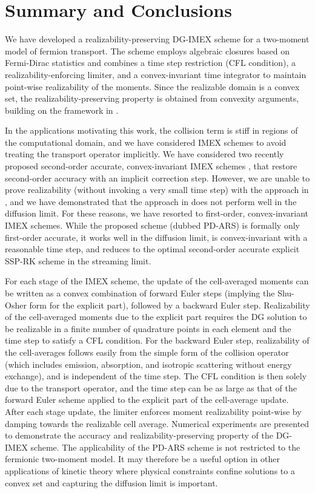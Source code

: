 \section{Summary and Conclusions}
\label{sec:conclusions}

We have developed a realizability-preserving DG-IMEX scheme for a two-moment model of fermion transport.  
The scheme employs algebraic closures based on Fermi-Dirac statistics and combines a time step restriction (CFL condition), a realizability-enforcing limiter, and a convex-invariant time integrator to maintain point-wise realizability of the moments.  
Since the realizable domain is a convex set, the realizability-preserving property is obtained from convexity arguments, building on the framework in \cite{zhangShu_2010a}.  

In the applications motivating this work, the collision term is stiff in regions of the computational domain, and we have considered IMEX schemes to avoid treating the transport operator implicitly.  
We have considered two recently proposed second-order accurate, convex-invariant IMEX schemes \cite{chertock_etal_2015,hu_etal_2018}, that restore second-order accuracy with an implicit correction step.  
However, we are unable to prove realizability (without invoking a very small time step) with the approach in \cite{chertock_etal_2015}, and we have demonstrated that the approach in \cite{hu_etal_2018} does not perform well in the diffusion limit.  
For these reasons, we have resorted to first-order, convex-invariant IMEX schemes.  
While the proposed scheme (dubbed PD-ARS) is formally only first-order accurate, it works well in the diffusion limit, is convex-invariant with a reasonable time step, and reduces to the optimal second-order accurate explicit SSP-RK scheme in the streaming limit.  

For each stage of the IMEX scheme, the update of the cell-averaged moments can be written as a convex combination of forward Euler steps (implying the Shu-Osher form for the explicit part), followed by a backward Euler step.  
Realizability of the cell-averaged moments due to the explicit part requires the DG solution to be realizable in a finite number of quadrature points in each element and the time step to satisfy a CFL condition.  
For the backward Euler step, realizability of the cell-averages follows easily from the simple form of the collision operator (which includes emission, absorption, and isotropic scattering without energy exchange), and is independent of the time step.  
The CFL condition is then solely due to the transport operator, and the time step can be as large as that of the forward Euler scheme applied to the explicit part of the cell-average update.  
After each stage update, the limiter enforces moment realizability point-wise by damping towards the realizable cell average.  
Numerical experiments are presented to demonstrate the accuracy and realizability-preserving property of the DG-IMEX scheme.  
The applicability of the PD-ARS scheme is not restricted to the fermionic two-moment model.  
It may therefore be a useful option in other applications of kinetic theory where physical constraints confine solutions to a convex set and capturing the diffusion limit is important.  

